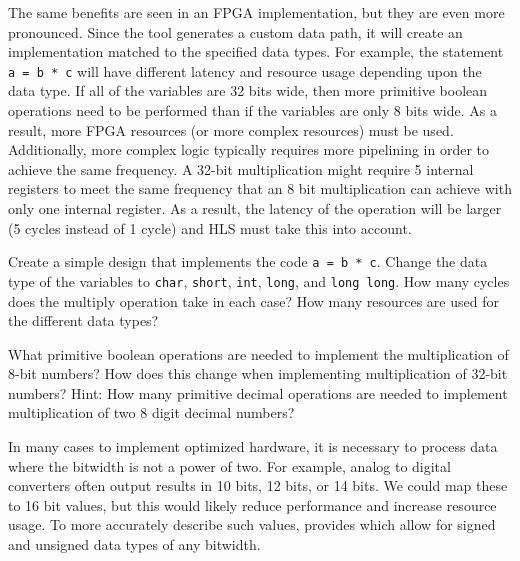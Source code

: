 The same benefits are seen in an FPGA implementation, but they are even more pronounced. Since the \VHLS tool generates a custom data path, it will create an implementation matched to the specified data types. For example, the statement \lstinline{a = b * c} will have different latency and resource usage depending upon the data type. If all of the variables are 32 bits wide, then more primitive boolean operations need to be performed than if the variables are only 8 bits wide.   As a result, more FPGA resources (or more complex resources) must be used.  Additionally, more complex logic typically requires more pipelining in order to achieve the same frequency.  A 32-bit multiplication might require 5 internal registers to meet the same frequency that an 8 bit multiplication can achieve with only one internal register. As a result, the latency of the operation will be larger (5 cycles instead of 1 cycle) and HLS must take this into account.

\begin{exercise}
Create a simple design that implements the code \lstinline{a = b * c}. Change the data type of the variables to \lstinline{char}, \lstinline{short}, \lstinline{int}, \lstinline{long}, and \lstinline{long long}. How many cycles does the multiply operation take in each case? How many resources are used for the different data types?
\end{exercise}

\begin{exercise}
What primitive boolean operations are needed to implement the multiplication of 8-bit numbers?  How does this change when implementing multiplication of 32-bit numbers?  Hint: How many primitive decimal operations are needed to implement multiplication of two 8 digit decimal numbers? \end{exercise}

In many cases to implement optimized hardware, it is necessary to process data where the bitwidth is not a power of two. For example, analog to digital converters often output results in 10 bits, 12 bits, or 14 bits.  We could map these to 16 bit values, but this would likely reduce performance and increase resource usage.  To more accurately describe such values, \VHLS provides  which allow for signed and unsigned data types of any bitwidth. 

